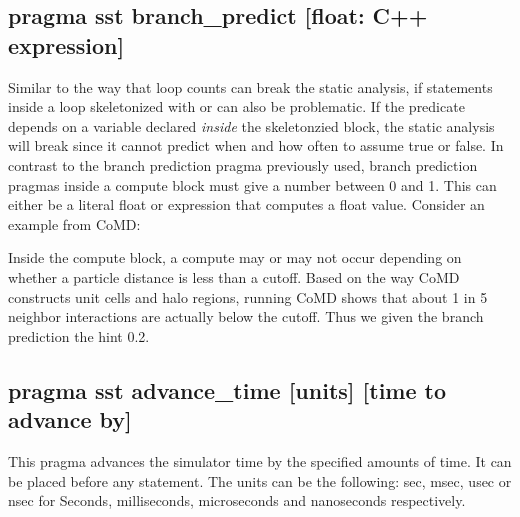 \subsection{pragma sst branch\_predict [float: C++ expression]}
Similar to the way that loop counts can break the static analysis, if statements inside a loop skeletonized with  or  can also be problematic.
If the predicate depends on a variable declared \emph{inside} the skeletonzied block,
the static analysis will break since it cannot predict when and how often to assume true or false.
In contrast to the branch prediction pragma previously used, branch prediction pragmas inside a compute block must give a number between 0 and 1.
This can either be a literal float or expression that computes a float value.
Consider an example from CoMD:

\begin{CppCode}
#pragma sst branch_predict 0.2
  if(r2 <= rCut2 && r2 > 0.0){
\end{CppCode}
Inside the compute block, a compute may or may not occur depending on whether a particle distance is less than a cutoff.
Based on the way CoMD constructs unit cells and halo regions, running CoMD shows that about 1 in 5 neighbor interactions are actually below the cutoff.
Thus we given the branch prediction the hint 0.2.

\subsection{pragma sst advance\_time [units] [time to advance by]}
This pragma advances the simulator time by the specified amounts of time. It can be placed before any statement. The units can be the following: sec, msec, usec or nsec for Seconds, milliseconds, microseconds and nanoseconds respectively. 

%
